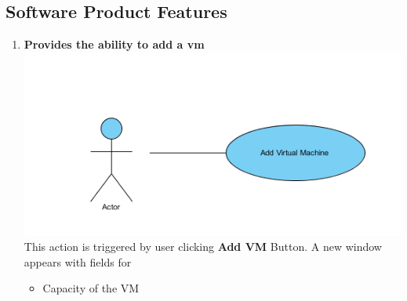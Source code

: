 \documentclass[a4paper,11pt]{article}
\begin{document}
		\subsection{Software Product Features}
			\begin{enumerate}
				\item {\bf Provides the ability to add a vm} \\
				\includegraphics{images/usecase}
				\\This action is triggered by user clicking {\bf Add VM } Button. A new window appears with fields for  
				\begin{itemize}
				 \item Capacity of the VM
				\end{itemize}
				

\end{enumerate}
\end{document}
